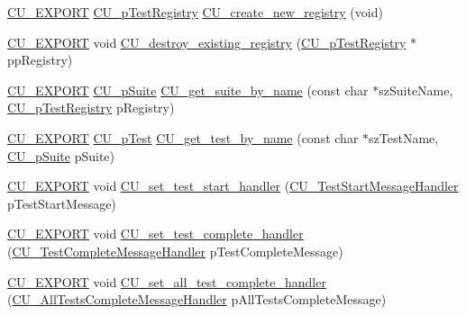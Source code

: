 \begin{DoxyCompactItemize}
\item 
\hyperlink{group___framework_ga22e538403fdee24be3388ab473fe64d5}{C\+U\+\_\+\+E\+X\+P\+O\+R\+T} \hyperlink{group___framework_ga2a416821761e04581a70c41ae3587d5c}{C\+U\+\_\+p\+Test\+Registry} \hyperlink{group___framework_ga5d2ce564b228122842f515cb4e5beda2}{C\+U\+\_\+create\+\_\+new\+\_\+registry} (void)
\item 
\hyperlink{group___framework_ga22e538403fdee24be3388ab473fe64d5}{C\+U\+\_\+\+E\+X\+P\+O\+R\+T} void \hyperlink{group___framework_ga7c46b0ae888482411575c93d5d780b0d}{C\+U\+\_\+destroy\+\_\+existing\+\_\+registry} (\hyperlink{group___framework_ga2a416821761e04581a70c41ae3587d5c}{C\+U\+\_\+p\+Test\+Registry} $\ast$pp\+Registry)
\item 
\hyperlink{group___framework_ga22e538403fdee24be3388ab473fe64d5}{C\+U\+\_\+\+E\+X\+P\+O\+R\+T} \hyperlink{group___framework_gaba832ae8b235f5e70d6a4ac9c3bb1219}{C\+U\+\_\+p\+Suite} \hyperlink{group___framework_ga625d2e3767cdb663399a99cf88321e60}{C\+U\+\_\+get\+\_\+suite\+\_\+by\+\_\+name} (const char $\ast$sz\+Suite\+Name, \hyperlink{group___framework_ga2a416821761e04581a70c41ae3587d5c}{C\+U\+\_\+p\+Test\+Registry} p\+Registry)
\item 
\hyperlink{group___framework_ga22e538403fdee24be3388ab473fe64d5}{C\+U\+\_\+\+E\+X\+P\+O\+R\+T} \hyperlink{group___framework_ga249c43fbe4e53452b3f90db1437da04b}{C\+U\+\_\+p\+Test} \hyperlink{group___framework_gab627141bbc9dff09228530d289517e9c}{C\+U\+\_\+get\+\_\+test\+\_\+by\+\_\+name} (const char $\ast$sz\+Test\+Name, \hyperlink{group___framework_gaba832ae8b235f5e70d6a4ac9c3bb1219}{C\+U\+\_\+p\+Suite} p\+Suite)
\item 
\hyperlink{group___framework_ga22e538403fdee24be3388ab473fe64d5}{C\+U\+\_\+\+E\+X\+P\+O\+R\+T} void \hyperlink{group___framework_gae89d85d65b1eac85f9950485456748e5}{C\+U\+\_\+set\+\_\+test\+\_\+start\+\_\+handler} (\hyperlink{group___framework_ga3330df7f5c95933f4ba21c648933c928}{C\+U\+\_\+\+Test\+Start\+Message\+Handler} p\+Test\+Start\+Message)
\item 
\hyperlink{group___framework_ga22e538403fdee24be3388ab473fe64d5}{C\+U\+\_\+\+E\+X\+P\+O\+R\+T} void \hyperlink{group___framework_gaefb891b295a40078428f38084a186588}{C\+U\+\_\+set\+\_\+test\+\_\+complete\+\_\+handler} (\hyperlink{group___framework_ga2c11da75531b097ca037223489bf02be}{C\+U\+\_\+\+Test\+Complete\+Message\+Handler} p\+Test\+Complete\+Message)
\item 
\hyperlink{group___framework_ga22e538403fdee24be3388ab473fe64d5}{C\+U\+\_\+\+E\+X\+P\+O\+R\+T} void \hyperlink{group___framework_ga875c98c7ec5df1a0450f1054a91506fb}{C\+U\+\_\+set\+\_\+all\+\_\+test\+\_\+complete\+\_\+handler} (\hyperlink{group___framework_ga5c8cffc5ce2801990436b3e6992bf770}{C\+U\+\_\+\+All\+Tests\+Complete\+Message\+Handler} p\+All\+Tests\+Complete\+Message)

\end{DoxyCompactItemize}
